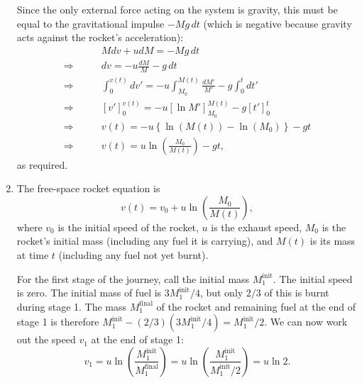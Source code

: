 \documentclass[12pt]{article}
\begin{document}
\begin{enumerate}
  Since the only external force acting on the system is gravity, this
  must be equal to the gravitational impulse $-Mg\,dt$ (which is negative
  because gravity acts against the rocket's acceleration):
  \begin{align*}
    &M dv + u dM = -Mg \, dt \\
    \Rightarrow \qquad
    &dv = -u\frac{dM}{M} - g \, dt \\
    \Rightarrow \qquad
    &\int_{0}^{v(t)} dv' = -u \int_{M_0}^{M(t)} \frac{dM'}{M'} -
      g\int_0^{t} dt' \\
    \Rightarrow \qquad
    &\left [ v' \right ]_0^{v(t)} = -u \left [ \ln M' \right
      ]_{M_0}^{M(t)} - g \left [ t' \right ]_0^{t} \\
    \Rightarrow \qquad
    &v(t) = -u \left \{ \ln(M(t)) - \ln(M_0) \right \} - gt \\
    \Rightarrow \qquad
    &v(t) = u\ln\left ( \frac{M_0}{M(t)} \right ) - gt,
  \end{align*}
  as required.

\item The free-space rocket equation is
  \begin{displaymath}
    v(t) = v_0 + u \ln \left ( \frac{M_0}{M(t)} \right ),
  \end{displaymath}
  where $v_0$ is the initial speed of the rocket, $u$ is the exhaust
  speed, $M_0$ is the rocket's initial mass (including any fuel it is
  carrying), and $M(t)$ is its mass at time $t$ (including any fuel not
  yet burnt).

  For the first stage of the journey, call the initial mass
  $M_1^{\text{init}}$. The initial speed is zero. The initial mass of
  fuel is $3M_1^{\text{init}}/4$, but only $2/3$ of this is burnt during
  stage 1. The mass $M_1^{\text{final}}$ of the rocket and remaining
  fuel at the end of stage 1 is therefore
  $M_1^{\text{init}} - (2/3)(3M_1^{\text{init}}/4) =
  M_1^{\text{init}}/2$. We can now work out the speed $v_1$ at the end
  of stage 1:
  \begin{displaymath}
    v_1 = u \ln \left ( \frac{M_1^{\text{init}}}{M_1^{\text{final}}} \right )
    = u\ln \left ( \frac{M_1^{\text{init}}}{M_1^{\text{init}}/2} \right ) = u\ln 2.
  \end{displaymath}


\end{enumerate}
\end{document}
